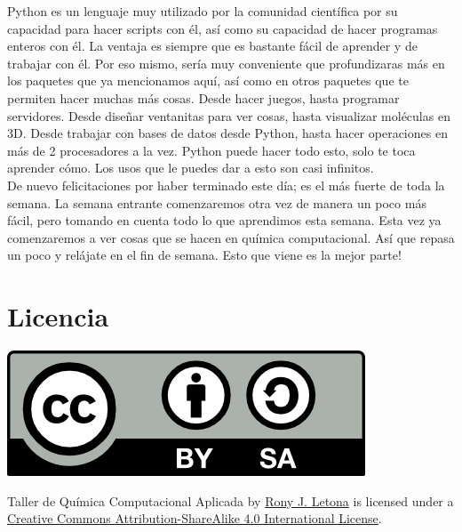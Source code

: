 \documentclass[10pt,letterpaper]{article}
\begin{document}
Python es un lenguaje muy utilizado por la comunidad cient\'ifica por su capacidad para hacer scripts con \'el, as\'i como su capacidad de hacer programas enteros con \'el. La ventaja es siempre que es bastante f\'acil de aprender y de trabajar con \'el. Por eso mismo, ser\'ia muy conveniente que profundizaras m\'as en los paquetes que ya mencionamos aqu\'i, as\'i como en otros paquetes que te permiten hacer muchas m\'as cosas. Desde hacer juegos, hasta programar servidores. Desde dise\~nar ventanitas para ver cosas, hasta visualizar mol\'eculas en 3D. Desde trabajar con bases de datos desde Python, hasta hacer operaciones en m\'as de 2 procesadores a la vez. Python puede hacer todo esto, solo te toca aprender c\'omo. Los usos que le puedes dar a esto son casi infinitos.\\

De nuevo felicitaciones por haber terminado este d\'ia; es el m\'as fuerte de toda la semana. La semana entrante comenzaremos otra vez de manera un poco m\'as f\'acil, pero tomando en cuenta todo lo que aprendimos esta semana. Esta vez ya comenzaremos a ver cosas que se hacen en qu\'imica computacional. As\'i que repasa un poco y rel\'ajate en el fin de semana. Esto que viene es la mejor parte!

\section*{Licencia}

\noindent \includegraphics{img/cc_big.png}

\noindent Taller de Qu\'imica Computacional Aplicada by \href{http://github.com/zronyj/TQCA}{Rony J. Letona} is licensed under a \href{http://creativecommons.org/licenses/by-sa/4.0/}{Creative Commons Attribution-ShareAlike 4.0 International License}.
\end{document}

